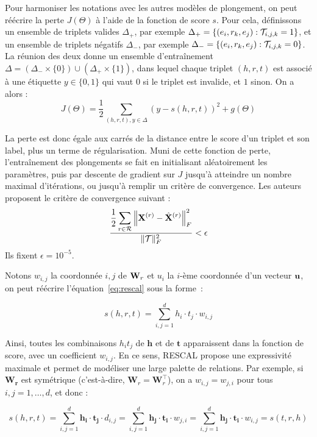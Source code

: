 Pour harmoniser les notations avec les autres modèles de plongement, on peut réécrire la perte $J(\Theta)$ à l'aide de la fonction de score $s$. Pour cela, définissons un ensemble de triplets valides $\Delta_+$, par exemple $\Delta_+ = \{(e_i, r_k, e_j) : \cal{T}_{i, j, k} = 1 \}$, et un ensemble de triplets négatifs $\Delta_-$, par exemple $\Delta_- = \{(e_i, r_k, e_j) : \cal{T}_{i, j, k} = 0 \}$. La réunion des deux donne un ensemble d'entraînement $\Delta = (\Delta_- \times \{ 0 \}) \cup (\Delta_+ \times \{ 1 \})$, dans lequel chaque triplet $(h, r, t)$ est associé à une étiquette $y \in \{ 0, 1\}$ qui vaut $0$ si le triplet est invalide, et $1$ sinon.
On a alors :
\begin{equation}
    J(\Theta) = \frac{1}{2} \sum_{(h, r, t), y \in \Delta} \left(y - s(h, r, t) \right)^2
    + g(\Theta)
\end{equation}

La perte est donc égale aux carrés de la distance entre le score d'un triplet et son label, plus un terme de régularisation. Muni de cette fonction de perte, l'entraînement des plongements se fait en initialisant aléatoirement les paramètres, puis par descente de gradient sur $J$ jusqu'à atteindre un nombre maximal d'itérations, ou jusqu'à remplir un critère de convergence. Les auteurs proposent le critère de convergence suivant :
\begin{equation}
    \frac{\displaystyle \frac{1}{2} \sum_{r \in \Rel} \left\| \bf{X}^{(r)} - \hat{\bf{X}}^{(r)} \right\|_F^2}{\| \cal{T} \|_F^2} < \epsilon
\end{equation}
Ils fixent $\epsilon = 10^{-5}$.


Notons $w_{i, j}$ la coordonnée $i,j$ de $\bf{W}_r$ et $u_i$ la $i$-ème coordonnée d'un vecteur $\bf{u}$, on peut réécrire l'équation~\ref{eq:rescal} sous la forme~:

\begin{equation}
    s(h, r, t) = \sum_{i, j = 1}^{d} h_i \cdot t_j \cdot w_{i, j}
\end{equation}

Ainsi, toutes les combinaisons $h_i t_j$ de $\mathbf{h}$ et de $\mathbf{t}$ apparaissent dans la fonction de score, avec un coefficient $w_{i, j}$. En ce sens, RESCAL propose une expressivité maximale et permet de modéliser une large palette de relations. Par exemple, si $\mathbf{W_r}$ est symétrique (c'est-à-dire, $\mathbf{W}_r = \mathbf{W}_r^\top$), on a $w_{i,j} = w_{j, i}$ pour tous $i, j = 1, \ldots, d$, et donc :

\begin{equation}
    s(h, r, t) = \sum_{i, j = 1}^{d} \mathbf{h_i \cdot t_j} \cdot d_{i, j}
    =  \sum_{i, j = 1}^{d} \mathbf{h_j \cdot t_i} \cdot w_{j, i}
    =  \sum_{i, j = 1}^{d} \mathbf{h_j \cdot t_i} \cdot w_{i, j}
    = s(t, r, h)
\end{equation}

